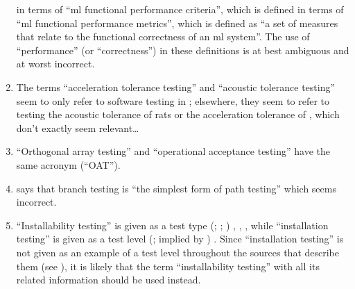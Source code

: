 \begin{enumerate}
          in terms of ``\acs{ml} functional performance criteria'',
          which is defined in terms of ``\acs{ml} functional performance
          metrics'', which is defined as ``a set of measures that relate to the
          functional correctness of an \acs{ml} system''. The use
          of ``performance'' (or ``correctness'') in these definitions is at
          best ambiguous and at worst incorrect.
    \item %
          The terms ``acceleration tolerance testing'' and ``acoustic tolerance
          testing'' seem to only refer to software testing in
          \citep[p.~56]{Firesmith2015};
          elsewhere, they seem to refer to testing the acoustic tolerance of
          rats \citep{HolleyEtAl1996} or the acceleration tolerance of
          \accelTolTest{}, which don't exactly seem relevant\dots%
    \item %
          ``Orthogonal array testing'' \ifnotpaper \citetext{%
                  \citealp[pp.~5-1,~5-11]{SWEBOK2024};
                  implied by \citealp[pp.~467,~473]{Valcheva2013};
                  \citealp[pp.~1573-1577,~1580]{YuEtAl2011}} \else
              \cite[pp.~5-1,~5-11]{SWEBOK2024} \fi and ``operational
          acceptance testing'' \citep[p.~30]{Firesmith2015} have the same
          acronym (``OAT'').

    \item %
           \citet[p.~119]{Patton2006} says that branch testing is
          ``the simplest form of path testing'' which seems incorrect.
    \item %
          ``Installability testing'' is given as a test type
          \ifnotpaper
              (\citealp[p.~22]{IEEE2022}; \citeyear[p.~38]{IEEE2021};
              \citeyear[p.~228]{IEEE2017})%
          \else
              \cite[p.~22]{IEEE2022}, \cite[p.~38]{IEEE2021}, \cite[p.~228]{IEEE2017}%
          \fi, while ``installation testing'' is given as a test level
          \ifnotpaper
              (\citealp[p.~439]{vanVliet2000}; implied by
              \citealp[p.~5-8]{SWEBOK2024})%
          \else
              \cite[p.~439]{vanVliet2000}%
          \fi. Since ``installation testing'' is not given as an example of a
          test level throughout the sources that describe them (see
          ), it is likely that the term ``installability
          testing'' with all its related information should be used instead.


\end{enumerate}
